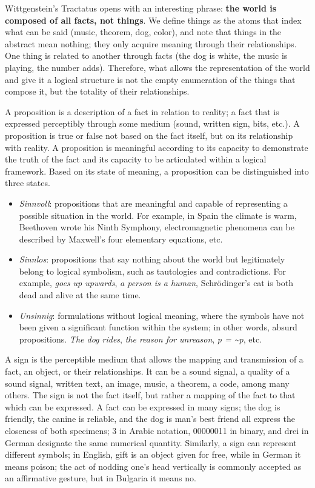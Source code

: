 \documentclass{article}
\begin{document}
Wittgenstein's Tractatus opens with an interesting phrase: \textbf{the
world is composed of all facts, not things}. We define things as the
atoms that index what can be said (music, theorem, dog, color), and note
that things in the abstract mean nothing; they only acquire meaning
through their relationships. One thing is related to another through
facts (the dog is white, the music is playing, the number adds).
Therefore, what allows the representation of the world and give it a
logical structure is not the empty enumeration of the things that
compose it, but the totality of their relationships.

A proposition is a description of a fact in relation to reality; a fact
that is expressed perceptibly through some medium (sound, written sign,
bits, etc.). A proposition is true or false not based on the fact
itself, but on its relationship with reality. A proposition is
meaningful according to its capacity to demonstrate the truth of the
fact and its capacity to be articulated within a logical framework.
Based on its state of meaning, a proposition can be distinguished into
three states.

\begin{itemize}
\item
  \emph{Sinnvoll}: propositions that are meaningful and capable of
  representing a possible situation in the world. For example, in Spain
  the climate is warm, Beethoven wrote his Ninth Symphony,
  electromagnetic phenomena can be described by Maxwell's four
  elementary equations, etc.
\item
  \emph{Sinnlos}: propositions that say nothing about the world but
  legitimately belong to logical symbolism, such as tautologies and
  contradictions. For example, \emph{goes up upwards}, \emph{a person is
  a human}, Schrödinger's cat is both dead and alive at the same time.
\item
  \emph{Unsinnig}: formulations without logical meaning, where the
  symbols have not been given a significant function within the system;
  in other words, absurd propositions. \emph{The dog rides}, \emph{the
  reason for unreason}, \emph{p = \textasciitilde p}, etc.
\end{itemize}

A sign is the perceptible medium that allows the mapping and
transmission of a fact, an object, or their relationships. It can be a
sound signal, a quality of a sound signal, written text, an image,
music, a theorem, a code, among many others. The sign is not the fact
itself, but rather a mapping of the fact to that which can be expressed.
A fact can be expressed in many signs; the dog is friendly, the canine
is reliable, and the dog is man's best friend all express the closeness
of both specimens; 3 in Arabic notation, 00000011 in binary, and drei in
German designate the same numerical quantity. Similarly, a sign can
represent different symbols; in English, gift is an object given for
free, while in German it means poison; the act of nodding one's head
vertically is commonly accepted as an affirmative gesture, but in
Bulgaria it means no.
\end{document}

